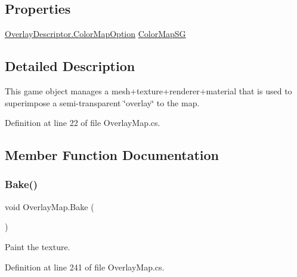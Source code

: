 \subsection*{Properties}
\begin{DoxyCompactItemize}
\item 
\hyperlink{class_overlay_descriptor_ace98995d8c49c9395934100f3e5e1240}{Overlay\+Descriptor.\+Color\+Map\+Option} \hyperlink{class_overlay_map_a5ecbeb0754f09284f3142a3b8f1f127f}{Color\+Map\+SG}
\end{DoxyCompactItemize}


\subsection{Detailed Description}
This game object manages a mesh+texture+renderer+material that is used to superimpose a semi-\/transparent \char`\"{}overlay\char`\"{} to the map. 



Definition at line 22 of file Overlay\+Map.\+cs.



\subsection{Member Function Documentation}
\mbox{\label{class_overlay_map_ad9a3b08f69584626858cd7c26f7bff56}} 
\subsubsection{\texorpdfstring{Bake()}{Bake()}}
{\footnotesize\ttfamily void Overlay\+Map.\+Bake (\begin{DoxyParamCaption}{ }\end{DoxyParamCaption})}



Paint the texture. 



Definition at line 241 of file Overlay\+Map.\+cs.

\mbox{\label{class_overlay_map_abe7d5d2e2d9895fd9116eb3f9f12d869}} 
